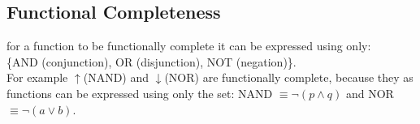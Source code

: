 \subsection{Functional Completeness}
\label{subsec:subsection0}
for a function to be functionally complete it can be expressed using only:\\ \{AND (conjunction), OR (disjunction), NOT (negation)\}. \\For example $\uparrow$(NAND) and $\downarrow$(NOR) are functionally complete, because they as functions can be expressed using only the set: 
NAND $\equiv \neg(p\land q)$ and NOR $\equiv \neg(a\lor b)$.\\